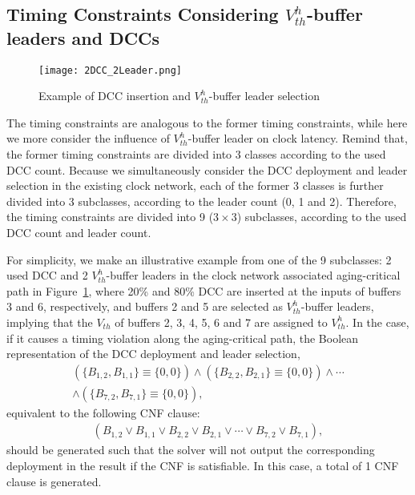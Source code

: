 \subsection{Timing Constraints Considering $V_{th}^h$-buffer leaders and DCCs}
\begin{figure}
    \centering
    \texttt{[image: 2DCC\_2Leader.png]}
    \caption{Example of DCC insertion and $V_{th}^h$-buffer leader selection}
    \label{fig:2dcc2leader}
\end{figure}
The timing constraints are analogous to the former timing constraints, while here we more consider the influence of $V_{th}^h$-buffer leader on clock latency. Remind that, the former timing constraints are divided into 3 classes according to the used DCC count. Because we simultaneously consider the DCC deployment and leader selection in the existing clock network, each of the former 3 classes is further divided into 3 subclasses, according to the leader count (0, 1 and 2). Therefore, the timing constraints are divided into 9 ($3 \times 3$) subclasses, according to the used DCC count and leader count.

For simplicity, we make an illustrative example from one of the 9 subclasses: 2 used DCC and 2 $V_{th}^h$-buffer leaders in the clock network associated aging-critical path in Figure~\ref{fig:2dcc2leader}, where 20\% and 80\% DCC are inserted at the inputs of buffers 3 and 6, respectively, and buffers 2 and 5 are selected as $V_{th}^h$-buffer leaders, implying that the $V_{th}$ of buffers 2, 3, 4, 5, 6 and 7 are assigned to $V_{th}^h$. In the case, if it causes a timing violation along the aging-critical path, the Boolean representation of the DCC deployment and leader selection,
{\fontsize{8}{8.4}
\begin{gather*}
\left(\{B_{1,2}, B_{1,1}\} \equiv \{0, 0\} \right) \land \left( \{B_{2,2}, B_{2,1}\} \equiv \{0, 0\} \right) \land \dotsb \\
\land \left( \{B_{7,2}, B_{7,1}\} \equiv \{0, 0\} \right),
\end{gather*}}
equivalent to the following CNF clause:
{\fontsize{8}{8.4}
\begin{gather*}
\left(B_{1,2} \lor B_{1,1} \lor B_{2,2} \lor B_{2,1} \lor \dotsb \lor B_{7,2} \lor B_{7,1} \right),
\end{gather*}}
should be generated such that the solver will not output the corresponding deployment in the result if the CNF is satisfiable. In this case, a total of 1 CNF clause is generated.

